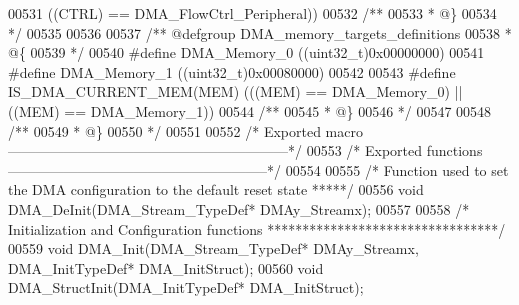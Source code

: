 \begin{DoxyCode}
00531                                 \textcolor{preprocessor}{(}\textcolor{preprocessor}{(}\textcolor{preprocessor}{CTRL}\textcolor{preprocessor}{)} \textcolor{preprocessor}{==} DMA_FlowCtrl_Peripheral\textcolor{preprocessor}{)}\textcolor{preprocessor}{)}
00532 \textcolor{comment}{/**}
00533 \textcolor{comment}{  * @\}}
00534 \textcolor{comment}{  */}
00535 
00536 
00537 \textcolor{comment}{/** @defgroup DMA\_memory\_targets\_definitions }
00538 \textcolor{comment}{  * @\{}
00539 \textcolor{comment}{  */}
00540 \textcolor{preprocessor}{#}\textcolor{preprocessor}{define} \textcolor{preprocessor}{DMA\_Memory\_0}                      \textcolor{preprocessor}{(}\textcolor{preprocessor}{(}\textcolor{preprocessor}{uint32\_t}\textcolor{preprocessor}{)}0x00000000\textcolor{preprocessor}{)}
00541 \textcolor{preprocessor}{#}\textcolor{preprocessor}{define} \textcolor{preprocessor}{DMA\_Memory\_1}                      \textcolor{preprocessor}{(}\textcolor{preprocessor}{(}\textcolor{preprocessor}{uint32\_t}\textcolor{preprocessor}{)}0x00080000\textcolor{preprocessor}{)}
00542 
00543 \textcolor{preprocessor}{#}\textcolor{preprocessor}{define} \textcolor{preprocessor}{IS\_DMA\_CURRENT\_MEM}\textcolor{preprocessor}{(}\textcolor{preprocessor}{MEM}\textcolor{preprocessor}{)} \textcolor{preprocessor}{(}\textcolor{preprocessor}{(}\textcolor{preprocessor}{(}\textcolor{preprocessor}{MEM}\textcolor{preprocessor}{)} \textcolor{preprocessor}{==} DMA_Memory_0\textcolor{preprocessor}{)} \textcolor{preprocessor}{||} \textcolor{preprocessor}{(}\textcolor{preprocessor}{(}\textcolor{preprocessor}{MEM}\textcolor{preprocessor}{)} \textcolor{preprocessor}{==} 
      DMA_Memory_1\textcolor{preprocessor}{)}\textcolor{preprocessor}{)}
00544 \textcolor{comment}{/**}
00545 \textcolor{comment}{  * @\}}
00546 \textcolor{comment}{  */}
00547 
00548 \textcolor{comment}{/**}
00549 \textcolor{comment}{  * @\}}
00550 \textcolor{comment}{  */}
00551 
00552 \textcolor{comment}{/* Exported macro ------------------------------------------------------------*/}
00553 \textcolor{comment}{/* Exported functions --------------------------------------------------------*/}
00554 
00555 \textcolor{comment}{/*  Function used to set the DMA configuration to the default reset state *****/}
00556 \textcolor{keywordtype}{void} DMA_DeInit(DMA\_Stream\_TypeDef* DMAy\_Streamx);
00557 
00558 \textcolor{comment}{/* Initialization and Configuration functions *********************************/}
00559 \textcolor{keywordtype}{void} DMA_Init(DMA\_Stream\_TypeDef* DMAy\_Streamx, DMA\_InitTypeDef* DMA\_InitStruct);
00560 \textcolor{keywordtype}{void} DMA_StructInit(DMA\_InitTypeDef* DMA\_InitStruct);

\end{DoxyCode}
